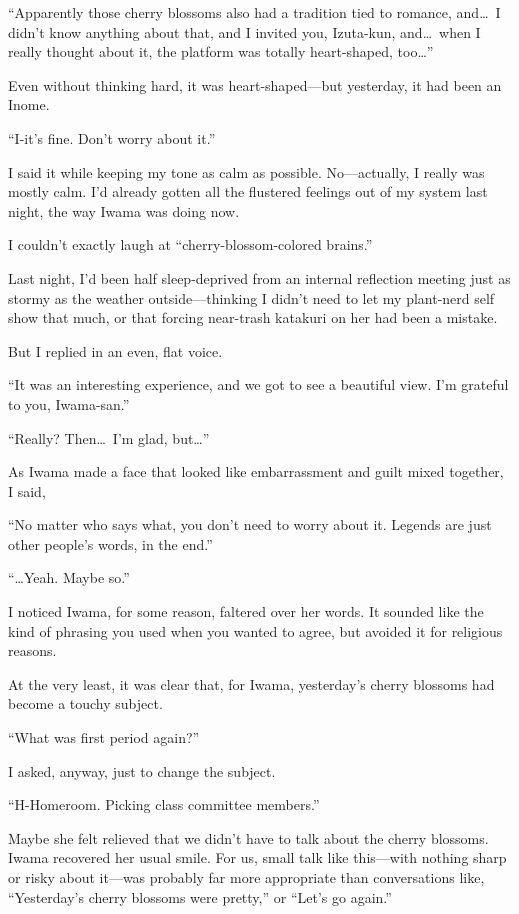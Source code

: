 \documentclass[
    a4paper,
    12pt,
    twoside,
    openany,
    UTF8,
    fontset=windows
]{ctexbook}
\begin{document}
``Apparently those cherry blossoms also had a tradition tied to romance, and\dots\ I didn't know anything about that, and I invited you, Izuta-kun, and\dots\ when I really thought about it, the platform was totally heart-shaped, too\dots''

Even without thinking hard, it was heart-shaped---but yesterday, it had been an Inome.

``I-it's fine. Don't worry about it.''

I said it while keeping my tone as calm as possible. No---actually, I really was mostly calm. I'd already gotten all the flustered feelings out of my system last night, the way Iwama was doing now.

I couldn't exactly laugh at ``cherry-blossom-colored brains.''

Last night, I'd been half sleep-deprived from an internal reflection meeting just as stormy as the weather outside---thinking I didn't need to let my plant-nerd self show that much, or that forcing near-trash katakuri on her had been a mistake.

But I replied in an even, flat voice.

``It was an interesting experience, and we got to see a beautiful view. I'm grateful to you, Iwama-san.''

``Really? Then\dots\ I'm glad, but\dots''

As Iwama made a face that looked like embarrassment and guilt mixed together, I said,

``No matter who says what, you don't need to worry about it. Legends are just other people's words, in the end.''

``\dots Yeah. Maybe so.''

I noticed Iwama, for some reason, faltered over her words. It sounded like the kind of phrasing you used when you wanted to agree, but avoided it for religious reasons.

At the very least, it was clear that, for Iwama, yesterday's cherry blossoms had become a touchy subject.

``What was first period again?''

I asked, anyway, just to change the subject.

``H-Homeroom. Picking class committee members.''

Maybe she felt relieved that we didn't have to talk about the cherry blossoms. Iwama recovered her usual smile. For us, small talk like this---with nothing sharp or risky about it---was probably far more appropriate than conversations like, ``Yesterday's cherry blossoms were pretty,'' or ``Let's go again.''
\end{document}

